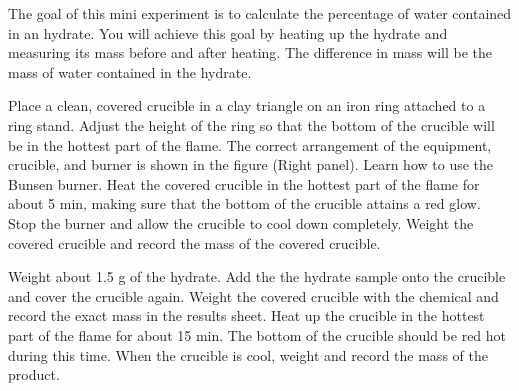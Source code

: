 \documentclass[main.tex]{subfiles}
\begin{document}
 \vspace{0.2cm}{\large \bfseries 2. Thermal decomposition of a hydrate}
The goal of this mini experiment is to calculate the percentage of water contained in an hydrate. You will achieve this goal by heating up the hydrate and measuring its mass before and after heating. The difference in mass will be the mass of water contained in the hydrate.
\begin{steps}
    \newstep[] Place a clean, covered crucible in a clay triangle on an iron ring attached to a ring stand. Adjust the height of the ring so that the bottom of the crucible will be in the hottest part of the flame. The correct arrangement of the equipment, crucible, and burner is shown in the figure (Right panel).   
        \newstep[] Learn how to use the Bunsen burner. Heat the covered crucible in the hottest part of the flame for about 5 min, making sure  that the bottom of the crucible attains a red glow.
       \newstep[] Stop the burner and allow the crucible to cool down completely.         
       \newstep[] Weight the covered crucible  and record the mass of the covered crucible.

       \newstep[] Weight about 1.5 g of the hydrate.
       \newstep[] Add the the hydrate sample onto the crucible and cover the crucible again. Weight the covered crucible with the chemical and record the exact mass in the results sheet.
       \newstep[] Heat up the crucible in the hottest part of the flame for about 15 min. The bottom of the crucible should be red hot during this time.
       \newstep[] When the crucible is cool, weight and record the mass of the product. 
       \end{steps}
 
\end{document}
